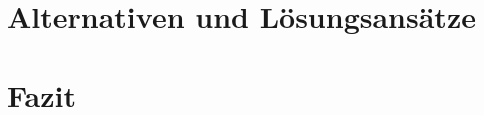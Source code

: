 \documentclass[ngerman]{seminarvorlage}
\begin{document}
\section{Alternativen und Lösungsansätze}

\section{Fazit}


%
%


\end{document}

